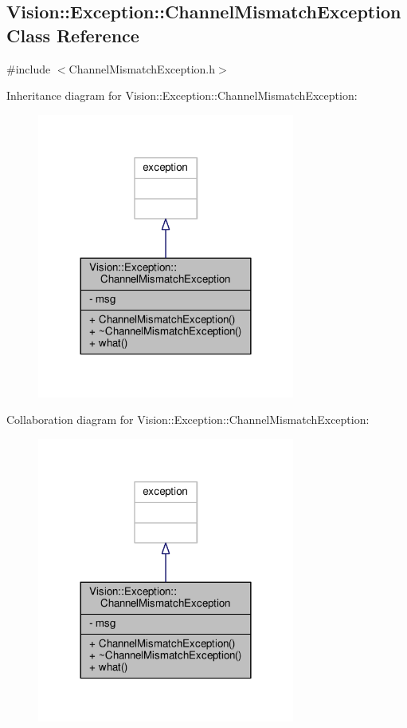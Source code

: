 \hypertarget{class_vision_1_1_exception_1_1_channel_mismatch_exception}{}\subsection{Vision\+:\+:Exception\+:\+:Channel\+Mismatch\+Exception Class Reference}
\label{class_vision_1_1_exception_1_1_channel_mismatch_exception}


{\ttfamily \#include $<$Channel\+Mismatch\+Exception.\+h$>$}



Inheritance diagram for Vision\+:\+:Exception\+:\+:Channel\+Mismatch\+Exception\+:
\nopagebreak
\begin{figure}[H]
\begin{center}
\leavevmode
\includegraphics[width=240pt]{class_vision_1_1_exception_1_1_channel_mismatch_exception__inherit__graph}
\end{center}
\end{figure}


Collaboration diagram for Vision\+:\+:Exception\+:\+:Channel\+Mismatch\+Exception\+:
\nopagebreak
\begin{figure}[H]
\begin{center}
\leavevmode
\includegraphics[width=240pt]{class_vision_1_1_exception_1_1_channel_mismatch_exception__coll__graph}
\end{center}
\end{figure}
